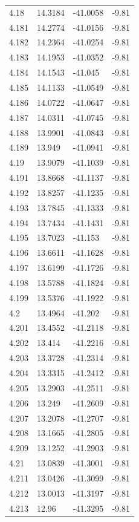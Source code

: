 \begin{tabular}{llll}
4.18 & 14.3184 & -41.0058 & -9.81 \\
4.181 & 14.2774 & -41.0156 & -9.81 \\
4.182 & 14.2364 & -41.0254 & -9.81 \\
4.183 & 14.1953 & -41.0352 & -9.81 \\
4.184 & 14.1543 & -41.045 & -9.81 \\
4.185 & 14.1133 & -41.0549 & -9.81 \\
4.186 & 14.0722 & -41.0647 & -9.81 \\
4.187 & 14.0311 & -41.0745 & -9.81 \\
4.188 & 13.9901 & -41.0843 & -9.81 \\
4.189 & 13.949 & -41.0941 & -9.81 \\
4.19 & 13.9079 & -41.1039 & -9.81 \\
4.191 & 13.8668 & -41.1137 & -9.81 \\
4.192 & 13.8257 & -41.1235 & -9.81 \\
4.193 & 13.7845 & -41.1333 & -9.81 \\
4.194 & 13.7434 & -41.1431 & -9.81 \\
4.195 & 13.7023 & -41.153 & -9.81 \\
4.196 & 13.6611 & -41.1628 & -9.81 \\
4.197 & 13.6199 & -41.1726 & -9.81 \\
4.198 & 13.5788 & -41.1824 & -9.81 \\
4.199 & 13.5376 & -41.1922 & -9.81 \\
4.2 & 13.4964 & -41.202 & -9.81 \\
4.201 & 13.4552 & -41.2118 & -9.81 \\
4.202 & 13.414 & -41.2216 & -9.81 \\
4.203 & 13.3728 & -41.2314 & -9.81 \\
4.204 & 13.3315 & -41.2412 & -9.81 \\
4.205 & 13.2903 & -41.2511 & -9.81 \\
4.206 & 13.249 & -41.2609 & -9.81 \\
4.207 & 13.2078 & -41.2707 & -9.81 \\
4.208 & 13.1665 & -41.2805 & -9.81 \\
4.209 & 13.1252 & -41.2903 & -9.81 \\
4.21 & 13.0839 & -41.3001 & -9.81 \\
4.211 & 13.0426 & -41.3099 & -9.81 \\
4.212 & 13.0013 & -41.3197 & -9.81 \\
4.213 & 12.96 & -41.3295 & -9.81 \\

\end{tabular}

